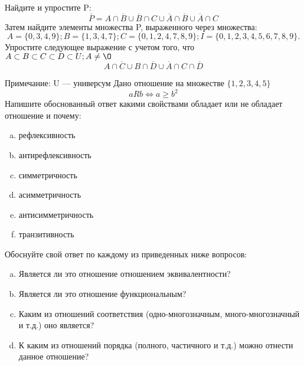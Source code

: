 \documentclass[10pt]{exam}
\begin{document}
\begin{questions}
\question
Найдите и упростите P:
\begin{equation*}
\overline{P} = A \cap \overline{B} \cup \overline{B} \cap C \cup \overline{A} \cap \overline{B} \cup \overline{A} \cap C
\end{equation*}
Затем найдите элементы множества P, выраженного через множества:
\begin{equation*}
A = \{0, 3, 4, 9\}; 
B = \{1, 3, 4, 7\};
C = \{0, 1, 2, 4, 7, 8, 9\};
I = \{0, 1, 2, 3, 4, 5, 6, 7, 8, 9\}.
\end{equation*}\question
Упростите следующее выражение с учетом того, что $A\subset B \subset C \subset D \subset U; A \neq \O$
\begin{equation*}
A \cap  \overline{C} \cup B \cap \overline{D} \cup  \overline{A} \cap C \cap  \overline{D}
\end{equation*}

Примечание: U — универсум\question
Дано отношение на множестве $\{1, 2, 3, 4, 5\}$ 
\begin{equation*}
aRb \iff a \geq b^2
\end{equation*}
Напишите обоснованный ответ какими свойствами обладает или не обладает отношение и почему:   
\begin{enumerate} [a)]\setcounter{enumi}{0}
\item рефлексивность
\item антирефлексивность
\item симметричность
\item асимметричность
\item антисимметричность
\item транзитивность
\end{enumerate}

Обоснуйте свой ответ по каждому из приведенных ниже вопросов:
\begin{enumerate} [a)]\setcounter{enumi}{0}
    \item Является ли это отношение отношением эквивалентности?
    \item Является ли это отношение функциональным?
    \item Каким из отношений соответствия (одно-многозначным, много-многозначный и т.д.) оно является?
    \item К каким из отношений порядка (полного, частичного и т.д.) можно отнести данное отношение?
\end{enumerate}



\end{questions}
\end{document}
